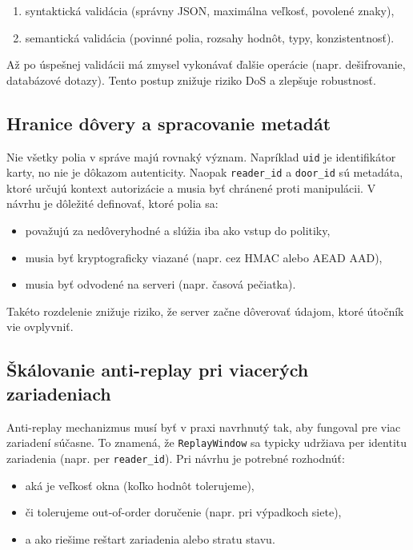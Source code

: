 \documentclass[journal,a4paper,onecolumn]{IEEEtran}
\begin{document}
\begin{enumerate}[leftmargin=*,itemsep=2pt]
  \item syntaktická validácia (správny JSON, maximálna veľkosť, povolené znaky),
  \item semantická validácia (povinné polia, rozsahy hodnôt, typy, konzistentnosť).
\end{enumerate}

Až po úspešnej validácii má zmysel vykonávať ďalšie operácie (napr. dešifrovanie, databázové dotazy). Tento postup znižuje riziko DoS a zlepšuje robustnosť.

\subsection{Hranice dôvery a spracovanie metadát}

Nie všetky polia v správe majú rovnaký význam. Napríklad \texttt{uid} je identifikátor karty, no nie je dôkazom autenticity. Naopak \texttt{reader\_id} a \texttt{door\_id} sú metadáta, ktoré určujú kontext autorizácie a musia byť chránené proti manipulácii. V návrhu je dôležité definovať, ktoré polia sa:

\begin{itemize}[leftmargin=*,itemsep=2pt]
  \item považujú za nedôveryhodné a slúžia iba ako vstup do politiky,
  \item musia byť kryptograficky viazané (napr. cez HMAC alebo AEAD AAD),
  \item musia byť odvodené na serveri (napr. časová pečiatka).
\end{itemize}

Takéto rozdelenie znižuje riziko, že server začne dôverovať údajom, ktoré útočník vie ovplyvniť.

\subsection{Škálovanie anti-replay pri viacerých zariadeniach}

Anti-replay mechanizmus musí byť v praxi navrhnutý tak, aby fungoval pre viac zariadení súčasne. To znamená, že \texttt{ReplayWindow} sa typicky udržiava per identitu zariadenia (napr. per \texttt{reader\_id}). Pri návrhu je potrebné rozhodnúť:

\begin{itemize}[leftmargin=*,itemsep=2pt]
  \item aká je veľkosť okna (koľko hodnôt tolerujeme),
  \item či tolerujeme out-of-order doručenie (napr. pri výpadkoch siete),
  \item a ako riešime reštart zariadenia alebo stratu stavu.
\end{itemize}
\end{document}
